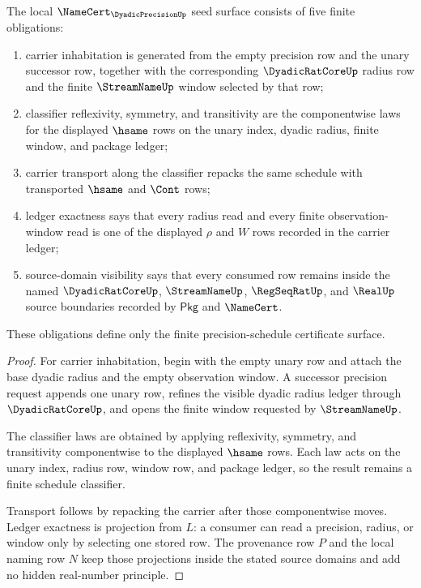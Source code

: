 \begin{theorem}
\label{thm:dyadic-precision-schedule-namecert-obligations}
The local $\NameCert_{\DyadicPrecisionUp}$ seed surface consists of five finite obligations:
\begin{enumerate}
\item carrier inhabitation is generated from the empty precision row and the unary successor row, together with the corresponding $\DyadicRatCoreUp$ radius row and the finite $\StreamNameUp$ window selected by that row;
\item classifier reflexivity, symmetry, and transitivity are the componentwise laws for the displayed $\hsame$ rows on the unary index, dyadic radius, finite window, and package ledger;
\item carrier transport along the classifier repacks the same schedule with transported $\hsame$ and $\Cont$ rows;
\item ledger exactness says that every radius read and every finite observation-window read is one of the displayed $\rho$ and $W$ rows recorded in the carrier ledger;
\item source-domain visibility says that every consumed row remains inside the named $\DyadicRatCoreUp$, $\StreamNameUp$, $\RegSeqRatUp$, and $\RealUp$ source boundaries recorded by $\mathsf{Pkg}$ and $\NameCert$.
\end{enumerate}
These obligations define only the finite precision-schedule certificate surface.
\end{theorem}
\begin{proof}
For carrier inhabitation, begin with the empty unary row and attach the base dyadic radius and the empty observation window. A successor precision request appends one unary row, refines the visible dyadic radius ledger through $\DyadicRatCoreUp$, and opens the finite window requested by $\StreamNameUp$.

The classifier laws are obtained by applying reflexivity, symmetry, and transitivity componentwise to the displayed $\hsame$ rows. Each law acts on the unary index, radius row, window row, and package ledger, so the result remains a finite schedule classifier.

Transport follows by repacking the carrier after those componentwise moves. Ledger exactness is projection from $L$: a consumer can read a precision, radius, or window only by selecting one stored row. The provenance row $P$ and the local naming row $N$ keep those projections inside the stated source domains and add no hidden real-number principle.
\end{proof}

